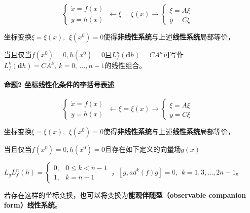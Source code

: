 \documentclass[
  12pt,
  a4paper
]{article}
\begin{document}
\[\left\{ \begin{array}{r}
\dot{x} = f(x) \\
y = h(x)
\end{array} \right.\  \leftarrow \xi = \xi(x) \rightarrow \left\{ \begin{array}{r}
\dot{\xi} = A\xi \\
y = C\xi
\end{array} \right.\ \]

坐标变换\(\xi = \xi(x),\ \ \xi\left( x^{0} \right) = 0\)使得\textbf{非线性系统}与上述\textbf{线性系统}局部等价，

当且仅当\(f\left( x^{0} \right) = 0,h\left( x^{0} \right) = 0\)且\(L_{f}^{n}\left( \mathbf{d}h \right) = CA^{n}\)可写作\(L_{f}^{k}\left( \mathbf{d}h \right) = CA^{k},\ k = 0,\ \ldots,n - 1\)的线性组合。

\paragraph{命题2
坐标线性化条件的李括号表述}\label{ux547dux98982-ux5750ux6807ux7ebfux6027ux5316ux6761ux4ef6ux7684ux674eux62ecux53f7ux8868ux8ff0}

\[\left\{ \begin{array}{r}
\dot{x} = f(x) \\
y = h(x)
\end{array} \right.\  \leftarrow \xi = \xi(x) \rightarrow \left\{ \begin{array}{r}
\dot{\xi} = A\xi \\
y = C\xi
\end{array} \right.\ \]

坐标变换\(\xi = \xi(x),\ \ \xi\left( x^{0} \right) = 0\)使得\textbf{非线性系统}与上述\textbf{线性系统}局部等价，

当且仅当\(f\left( x^{0} \right) = 0,h\left( x^{0} \right) = 0\)且存在如下定义的向量场\(g(x)\)

\(L_{g}L_{f}^{n}(h) = \left\{ \begin{aligned}
0, & 0 \leq k < n - 1 \\
1, & k = n - 1
\end{aligned} \right.\ \)，\(\left\lbrack g,{ad}^{k}(f)g \right\rbrack = 0,\ \ k = 1,3,\ldots,2n - 1\)。

若存在这样的坐标变换，也可以将变换为\textbf{能观伴随型（observable
companion form）线性系统}。
\end{document}
